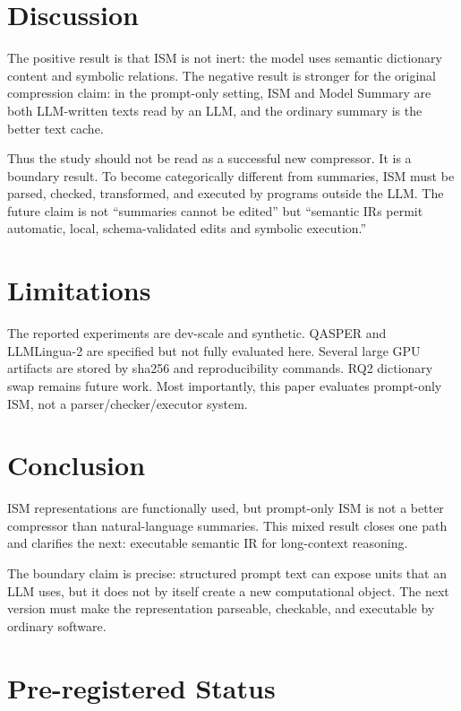 \documentclass[10pt,twocolumn]{article}
\newcommand{\ism}{\textsc{ISM}}
\begin{document}
\section{Discussion}

The positive result is that \ism{} is not inert: the model uses semantic
dictionary content and symbolic relations.  The negative result is stronger for
the original compression claim: in the prompt-only setting, \ism{} and Model
Summary are both LLM-written texts read by an LLM, and the ordinary summary is
the better text cache.

Thus the study should not be read as a successful new compressor.  It is a
boundary result.  To become categorically different from summaries, \ism{} must
be parsed, checked, transformed, and executed by programs outside the LLM.  The
future claim is not ``summaries cannot be edited'' but ``semantic IRs permit
automatic, local, schema-validated edits and symbolic execution.''

\section{Limitations}

The reported experiments are dev-scale and synthetic.  QASPER
\citep{dasigi2021qasper} and LLMLingua-2 are specified but not fully evaluated
here.  Several large GPU artifacts are stored by sha256 and reproducibility
commands.  RQ2 dictionary swap remains future work.  Most importantly, this
paper evaluates prompt-only \ism{}, not a parser/checker/executor system.

\section{Conclusion}

\ism{} representations are functionally used, but prompt-only \ism{} is not a
better compressor than natural-language summaries.  This mixed result closes
one path and clarifies the next: executable semantic IR for long-context
reasoning.

The boundary claim is precise: structured prompt text can expose units that an
LLM uses, but it does not by itself create a new computational object.  The next
version must make the representation parseable, checkable, and executable by
ordinary software.

\section{Pre-registered Status}
\end{document}
